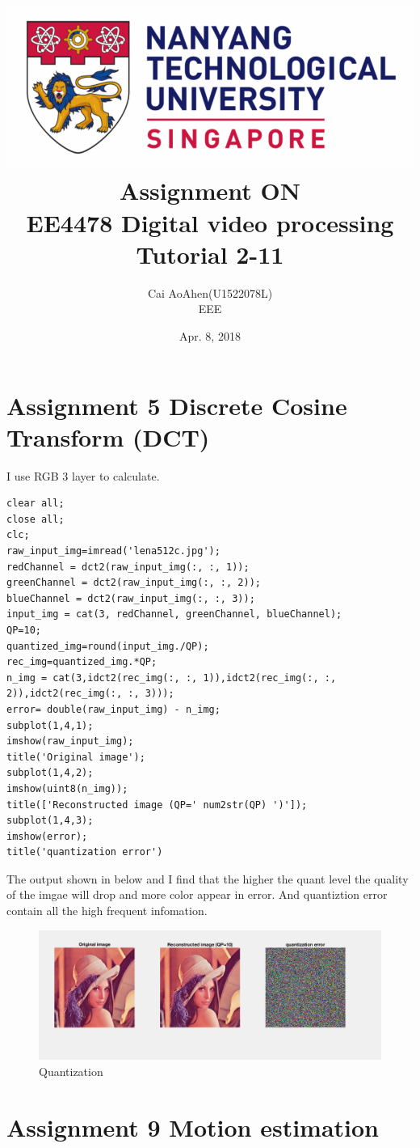 \documentclass[titlepage]{article}
\author{Cai AoAhen(U1522078L) \\
EEE \\
}
\date{Apr. 8, 2018 \\
}
\title{\includegraphics[width=\textwidth]{img/NTU.png} \\
[2\baselineskip] Assignment ON \\
EE4478 Digital video processing\\
Tutorial 2-11 \\
[3\baselineskip]}
\begin{document}
\maketitle
\tableofcontents

\listoffigures
\listoftables

\newpage

\section{Assignment 5 Discrete Cosine Transform (DCT)}
\label{sec:orgc723f27}

I use RGB 3 layer to calculate.
\begin{verbatim}
clear all;
close all;
clc;
raw_input_img=imread('lena512c.jpg');
redChannel = dct2(raw_input_img(:, :, 1));
greenChannel = dct2(raw_input_img(:, :, 2));
blueChannel = dct2(raw_input_img(:, :, 3));
input_img = cat(3, redChannel, greenChannel, blueChannel);
QP=10;
quantized_img=round(input_img./QP);
rec_img=quantized_img.*QP;
n_img = cat(3,idct2(rec_img(:, :, 1)),idct2(rec_img(:, :, 2)),idct2(rec_img(:, :, 3)));
error= double(raw_input_img) - n_img;
subplot(1,4,1);
imshow(raw_input_img);
title('Original image');
subplot(1,4,2);
imshow(uint8(n_img));
title(['Reconstructed image (QP=' num2str(QP) ')']);
subplot(1,4,3);
imshow(error);
title('quantization error')
\end{verbatim}

The output shown in below and I find that the higher the quant level the quality of the imgae will drop and more color appear in error. And quantiztion error contain all the high frequent infomation.

\begin{figure}[htbp]
\centering
\includegraphics[height=0.4\textwidth]{./img/quant.png}
\caption{Quantization}
\end{figure}

\newpage


\section{Assignment 9 Motion estimation}
\label{sec:org80e6a1e}
\end{document}
